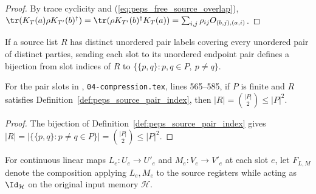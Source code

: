 \begin{proof}\leanok
    By trace cyclicity and (\ref{eq:peps_free_source_overlap}),
    $\tr(K_T(a)\rho K_{T'}(b)^\dagger)=\tr(\rho K_{T'}(b)^\dagger K_T(a))
        =\sum_{i,j}\rho_{ij}O_{(b,j),(a,i)}$.
\end{proof}

\begin{definition}
    \label{def:peps_source_pair_index}
    \leanok
    If a source list $R$ has distinct unordered pair labels covering every
    unordered pair of distinct parties, sending each slot to its unordered
    endpoint pair defines a bijection from slot indices of $R$ to
    $\{\{p,q\}:p,q\in P,\ p\ne q\}$.
\end{definition}

\begin{lemma}
    \label{thm:peps_source_pair_count}
    \leanok
    For the pair slots in \cite[proof of Theorem~5.2]{OpenAI2026PolynomialPEPS},
    \texttt{04-compression.tex}, lines 565--585, if $P$ is finite and $R$
    satisfies Definition~\ref{def:peps_source_pair_index}, then
    $|R|=\binom{|P|}{2}\le|P|^2$.
\end{lemma}

\begin{proof}\leanok
    The bijection of Definition~\ref{def:peps_source_pair_index} gives
    $|R|=|\{\{p,q\}:p\neq q\in P\}|=\binom{|P|}{2}\le|P|^2$.
\end{proof}

\begin{definition}
    \label{def:peps_source_slot_maps}
    \leanok
    For continuous linear maps $L_e:U_e\to U'_e$ and $M_e:V_e\to V'_e$ at each
    slot $e$, let $F_{L,M}$ denote the composition applying $L_e,M_e$ to the
    source registers while acting as $\Id_{\mathcal H}$ on the original input
    memory $\mathcal H$.
\end{definition}

